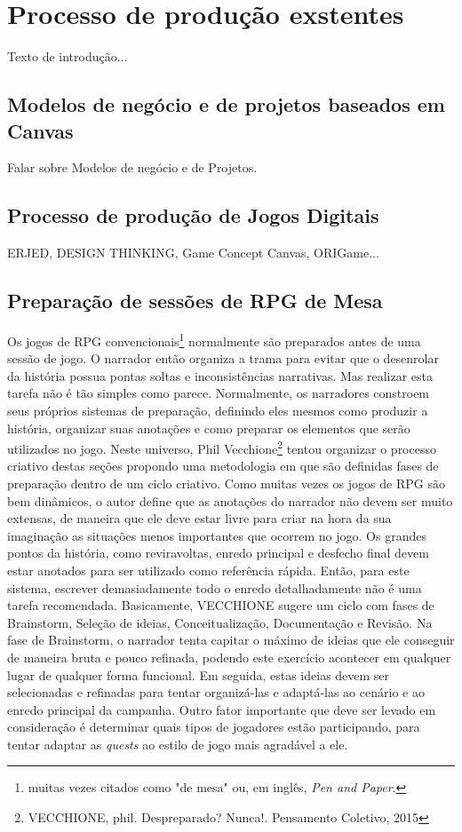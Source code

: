 \documentclass[
	12pt,				%
	openright,			%
	twoside,			%
	a4paper,			%
	english,			%
	french,				%
	spanish,			%
	brazil				%
	]{abntex2}
\begin{document}
\chapter{Processo de produção exstentes}

Texto de introdução...


\section{Modelos de negócio e de projetos baseados em Canvas}


Falar sobre Modelos de negócio e de Projetos.


\section{Processo de produção de Jogos Digitais}

ERJED, DESIGN THINKING, Game Concept Canvas, ORIGame...

\section{Preparação de sessões de RPG de Mesa}

Os jogos de RPG convencionais\footnote{muitas vezes citados como "de mesa" ou, em inglês, \emph{Pen and Paper}.} normalmente são preparados antes de uma sessão de jogo. O narrador então organiza a trama para evitar que o desenrolar da história possua pontas soltas e inconsistências narrativas. Mas realizar esta tarefa não é tão simples como parece. Normalmente, os narradores constroem seus próprios sistemas de preparação, definindo eles mesmos como produzir a história, organizar suas anotações e como preparar os elementos que serão utilizados no jogo. Neste universo, Phil Vecchione\footnote{VECCHIONE, phil. Despreparado? Nunca!. Pensamento Coletivo, 2015} tentou organizar o processo criativo destas seções propondo uma metodologia em que são definidas fases de preparação dentro de um ciclo criativo. Como muitas vezes os jogos de RPG são bem dinâmicos, o autor define que as anotações do narrador não devem ser muito extensas, de maneira que ele deve estar livre para criar na hora da sua imaginação as situações menos importantes que ocorrem no jogo. Os grandes pontos da história, como reviravoltas, enredo principal e desfecho final devem estar anotados para ser utilizado como referência rápida. Então, para este sistema, escrever demasiadamente todo o enredo detalhadamente não é uma tarefa recomendada. Basicamente, VECCHIONE sugere um ciclo com fases de Brainstorm, Seleção de ideias, Conceitualização, Documentação e Revisão. Na fase de Brainstorm, o narrador tenta capitar o máximo de ideias que ele conseguir de maneira bruta e pouco refinada, podendo este exercício acontecer em qualquer lugar de qualquer forma funcional. Em seguida, estas ideias devem ser selecionadas e refinadas para tentar organizá-las e adaptá-las ao cenário e ao enredo principal da campanha. Outro fator importante que deve ser levado em consideração é determinar quais tipos de jogadores estão participando, para tentar adaptar as \emph{quests} ao estilo de jogo mais agradável a ele.
\end{document}
